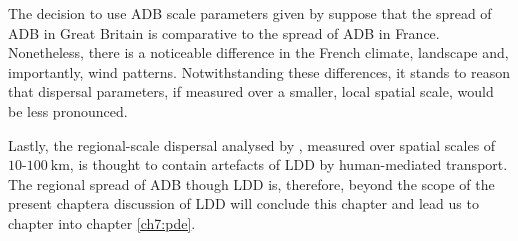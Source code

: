 The decision to use ADB scale parameters given by \cite{grosdidier2018tracking} suppose that the spread of ADB in Great Britain is comparative to the spread of ADB in France. Nonetheless, there is a noticeable difference in the French climate, landscape and, importantly, wind patterns. %
Notwithstanding these differences, it stands to reason that dispersal parameters, if measured over a smaller, local spatial scale, would be less pronounced. 

Lastly, the regional-scale dispersal analysed by \cite{grosdidier2018tracking}, measured over spatial scales of $10$-$100\ \mathrm{km}$, is thought to contain artefacts of LDD by human-mediated transport. The regional spread of ADB though LDD is, therefore, beyond the scope of the present chapter\textemdash a discussion of LDD will conclude this chapter and lead us to chapter into chapter \ref{ch7:pde}.


